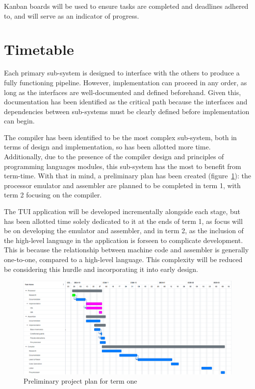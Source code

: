 \documentclass{article}
\begin{document}
    Kanban boards will be used to ensure tasks are completed and deadlines adhered to, and will serve as an indicator of progress.

    \section{Timetable}\label{sec:timetable}

    Each primary sub-system is designed to interface with the others to produce a fully functioning pipeline.
    However, implementation can proceed in any order, as long as the interfaces are well-documented and defined beforehand.
    Given this, documentation has been identified as the critical path because the interfaces and dependencies between sub-systems must be clearly defined before implementation can begin.

    The compiler has been identified to be the most complex sub-system, both in terms of design and implementation, so has been allotted more time.
    Additionally, due to the presence of the compiler design and principles of programming languages modules, this sub-system has the most to benefit from term-time.
    With that in mind, a preliminary plan has been created (figure~\ref{fig:gantt-chart}): the processor emulator and assembler are planned to be completed in term 1, with term 2 focusing on the compiler.

    The TUI application will be developed incrementally alongside each stage, but has been allotted time solely dedicated to it at the ends of term 1, as focus will be on developing the emulator and assembler, and in term 2, as the inclusion of the high-level language in the application is forseen to complicate development.
    This is because the relationship between machine code and assembler is generally one-to-one, compared to a high-level language.
    This complexity will be reduced be considering this hurdle and incorporating it into early design.

    \begin{figure}
        \centering
        \includegraphics[width=\textwidth]{assets/project-gantt-chart}
        \caption{Preliminary project plan for term one}
        \label{fig:gantt-chart}
    \end{figure}
\end{document}
